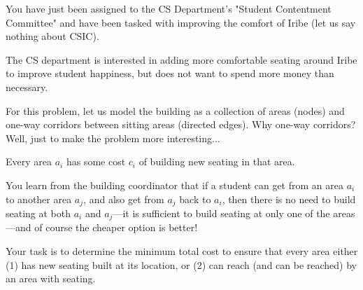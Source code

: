 You have just been assigned to the CS Department's "Student Contentment Committee" and have been tasked with improving the comfort of Iribe (let us say nothing about CSIC).

The CS department is interested in adding more comfortable seating around Iribe to improve student happiness, but does not want to spend more money than necessary.

For this problem, let us model the building as a collection of areas (nodes) and one-way corridors between sitting areas (directed edges). Why one-way corridors? Well, just to make the problem more interesting...

Every area $a_i$ has some cost $c_i$ of building new seating in that area.

You learn from the building coordinator that if a student can get from an area $a_i$ to another area $a_j$, and also get from $a_j$ back to $a_i$, then there is no need to build seating at both $a_i$ and $a_j$---it is sufficient to build seating at only one of the areas---and of course the cheaper option is better!

Your task is to determine the minimum total cost to ensure that every area either (1) has new seating built at its location, or (2) can reach (and can be reached) by an area with seating.